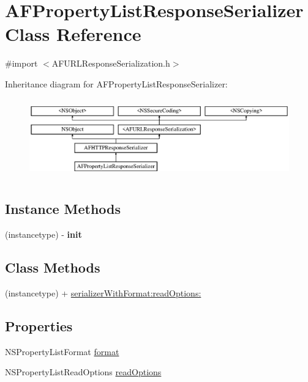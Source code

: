 \hypertarget{interface_a_f_property_list_response_serializer}{}\section{A\+F\+Property\+List\+Response\+Serializer Class Reference}
\label{interface_a_f_property_list_response_serializer}


{\ttfamily \#import $<$A\+F\+U\+R\+L\+Response\+Serialization.\+h$>$}

Inheritance diagram for A\+F\+Property\+List\+Response\+Serializer\+:\begin{figure}[H]
\begin{center}
\leavevmode
\includegraphics[height=3.489097cm]{interface_a_f_property_list_response_serializer}
\end{center}
\end{figure}
\subsection*{Instance Methods}
\begin{DoxyCompactItemize}
\item 
\hypertarget{interface_a_f_property_list_response_serializer_aad70acbaa3acbb3c746a81ee0e2a61bd}{}(instancetype) -\/ {\bfseries init}\label{interface_a_f_property_list_response_serializer_aad70acbaa3acbb3c746a81ee0e2a61bd}

\end{DoxyCompactItemize}
\subsection*{Class Methods}
\begin{DoxyCompactItemize}
\item 
(instancetype) + \hyperlink{interface_a_f_property_list_response_serializer_a546270f2494849feb6edc9d849e31b5e}{serializer\+With\+Format\+:read\+Options\+:}
\end{DoxyCompactItemize}
\subsection*{Properties}
\begin{DoxyCompactItemize}
\item 
N\+S\+Property\+List\+Format \hyperlink{interface_a_f_property_list_response_serializer_a616f88e89a24ca953c50e40f85177293}{format}
\item 
N\+S\+Property\+List\+Read\+Options \hyperlink{interface_a_f_property_list_response_serializer_a6913e8c365408a0800eb08b5396522f0}{read\+Options}
\end{DoxyCompactItemize}


